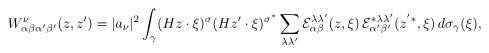 \begin{equation}
W^\nu _{\alpha\beta \alpha'\beta'}(z,z')= \vert
a_{\nu}\vert^{2}\int_\gamma (Hz\cdot \xi)^{\sigma} (H
z'\cdot\xi)^{\sigma^{*}}\sum_{\lambda\lambda'}{\cal
E}^{\lambda\lambda'}_{\alpha\beta }(z,\xi) \,{\cal
E}^{*\lambda\lambda'}_{\alpha'\beta'}(z^{'*},\xi)\,d\sigma_\gamma(\xi),
\label{eq:int}
\end{equation}

